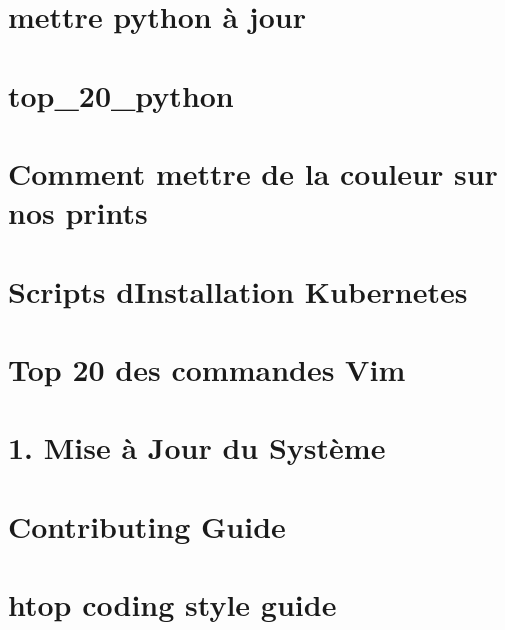 \documentclass[twoside]{book}
\newcommand{\+}{\discretionary{\mbox{\scriptsize$\hookleftarrow$}}{}{}}
\begin{document}
\chapter{mettre python à jour}
\label{md_base_connaissances_python_lancement_envi_virtuel_streamlit}

\chapter{top\+\_\+20\+\_\+python}
\label{md_base_connaissances_python_top_20_python}

\chapter{Comment mettre de la couleur sur nos prints}
\label{md_base_connaissances_shell_couleur_terminal}

\chapter{Scripts d\textquotesingle{}Installation Kubernetes}
\label{md_base_connaissances_shell_script_perso_README}

\chapter{Top 20 des commandes Vim}
\label{md_base_connaissances_shell_top_20_vim}

\chapter{1. Mise à Jour du Système}
\label{md_base_connaissances_shell_update_linux}

\chapter{Contributing Guide}
\label{md_linux_download_htop-3_83_80_CONTRIBUTING}

\chapter{htop coding style guide}
\label{md_linux_download_htop-3_83_80_docs_styleguide}

\end{document}
